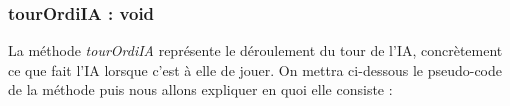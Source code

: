 \documentclass[12,french]{report}
\begin{document}
%
%
%
%
%

\subsubsection{tourOrdiIA : void}

La méthode \textit{tourOrdiIA} représente le déroulement du tour de l'IA, concrètement ce que fait l'IA lorsque c'est à elle de jouer. On mettra ci-dessous le pseudo-code de la méthode puis nous allons expliquer en quoi elle consiste :
\end{document}
